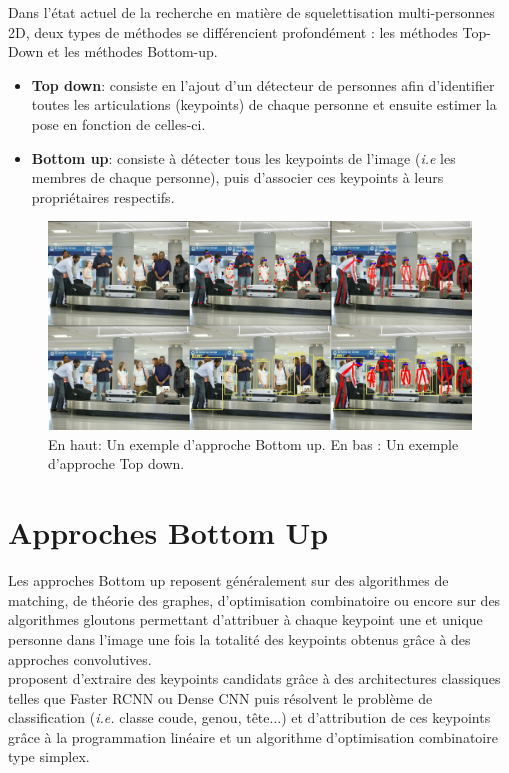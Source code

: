 Dans l'état actuel de la recherche en matière de squelettisation multi-personnes 2D, deux types de méthodes se différencient profondément : les méthodes Top-Down et les méthodes Bottom-up.
\begin{itemize}
    \item \textbf{Top down}: consiste en l'ajout d'un détecteur de personnes afin d'identifier toutes les articulations (keypoints) de chaque personne et ensuite estimer la pose en fonction de celles-ci.
    \item \textbf{Bottom up}: consiste à détecter tous les keypoints de l'image (\textit{i.e} les membres de chaque personne), puis d'associer ces keypoints à leurs propriétaires respectifs.
\end{itemize}

\begin{figure}[H]
    \centering
    \includegraphics[width=1\linewidth]{Images/topvsbottom2.png}
    \caption{En haut: Un exemple d'approche Bottom up. En bas : Un exemple d'approche Top down.}
    \label{fig:topvsbottom}
\end{figure}

\label{subsec:SQUEL}
\section{Approches Bottom Up}
Les approches Bottom up reposent généralement sur des algorithmes de matching, de théorie des graphes, d'optimisation combinatoire ou encore sur des algorithmes gloutons permettant d'attribuer à chaque keypoint une et unique personne dans l'image une fois la totalité des keypoints obtenus grâce à des approches convolutives.\\

\cite{2015arXiv151106645P} proposent d'extraire des keypoints candidats grâce à des architectures classiques telles que Faster RCNN \cite{ren2015faster} ou Dense CNN \cite{huang2017densely} puis résolvent le problème de classification (\textit{i.e.} classe coude, genou, tête...) et d'attribution de ces keypoints grâce à la programmation linéaire et un algorithme d'optimisation combinatoire type simplex. 

